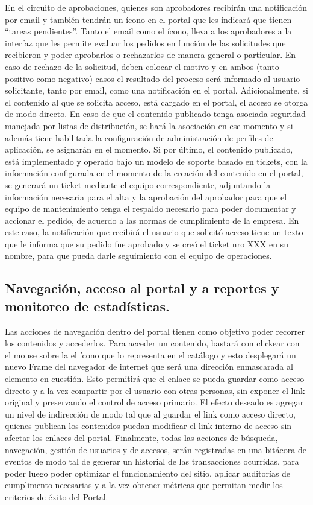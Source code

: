 En el circuito de aprobaciones, quienes son aprobadores recibirán una notificación por email y también tendrán un ícono en el portal que les indicará que tienen “tareas pendientes”. Tanto el email como el ícono, lleva a los aprobadores a la interfaz que les permite evaluar los pedidos en función de las solicitudes que recibieron y poder aprobarlos o rechazarlos de manera general o particular. En caso de rechazo de la solicitud, deben colocar el motivo y en ambos (tanto positivo como negativo) casos el resultado del proceso será informado al usuario solicitante, tanto por email, como una notificación en el portal.
	Adicionalmente, si el contenido al que se solicita acceso, está cargado en el portal, el acceso se otorga de modo directo.
	En caso de que el contenido publicado tenga asociada seguridad manejada por listas de distribución, se hará la asociación en ese momento y si además tiene habilitada la configuración de administración de perfiles de aplicación, se asignarán en el momento.
	Si por último, el contenido publicado, está implementado y operado bajo un modelo de soporte basado en tickets, con la información configurada en el momento de la creación del contenido en el portal, se generará un ticket mediante el equipo correspondiente, adjuntando la información necesaria para el alta y la aprobación del aprobador para que el equipo de mantenimiento tenga el respaldo necesario para poder documentar y accionar el pedido, de acuerdo a las normas de cumplimiento de la empresa. En este caso, la notificación que recibirá el usuario que solicitó acceso tiene un texto que le informa que su pedido fue aprobado y se creó el ticket nro XXX en su nombre, para que pueda darle seguimiento con el equipo de operaciones.


\subsection{Navegación, acceso al portal y a reportes y monitoreo de estadísticas.}

Las acciones de navegación dentro del portal tienen como objetivo poder recorrer los contenidos y accederlos. Para acceder un contenido, bastará con clickear con el mouse sobre la el ícono que lo representa en el catálogo y esto desplegará un nuevo Frame del navegador de internet que será una dirección enmascarada al elemento en cuestión. Esto permitirá que el enlace se pueda guardar como acceso directo y a la vez compartir por el usuario con otras personas, sin exponer el link original y preservando el control de acceso primario. El efecto deseado es agregar un nivel de indirección de modo tal que al guardar el link como acceso directo, quienes publican los contenidos puedan modificar el link interno de acceso sin afectar los enlaces del portal.
	Finalmente, todas las acciones de búsqueda, navegación, gestión de usuarios y de accesos, serán registradas en una bitácora de eventos de modo tal de generar un historial de las transacciones ocurridas, para poder luego poder optimizar el funcionamiento del sitio, aplicar auditorías de cumplimento necesarias y a la vez obtener métricas que permitan medir los criterios de éxito del Portal.	
